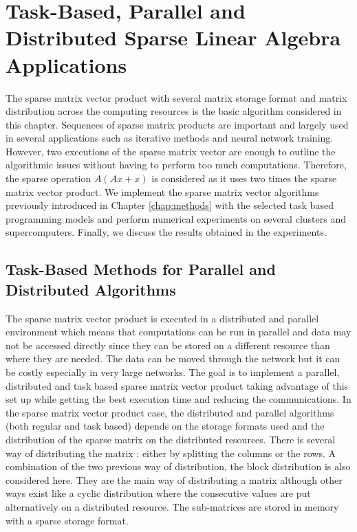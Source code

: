 %
\newcommand{\Array}{\KwSty{Array}}
\newcommand{\Integer}{\KwSty{Integer}}

\chapter{Task-Based, Parallel and Distributed Sparse Linear Algebra Applications \label{chap:exp_sparse}}
\graphicspath{{chapters/exp_sparse/}}

The sparse matrix vector product with several matrix storage format and matrix distribution across the computing resources is the basic algorithm considered in this chapter.
Sequences of sparse matrix products are important and largely used in several applications such as iterative methods and neural network training.
However, two executions of the sparse matrix vector are enough to outline the algorithmic issues without having to perform too much computations.
Therefore, the sparse operation $A(Ax+x)$ is considered as it uses two times the sparse matrix vector product.
We implement the sparse matrix vector algorithms previously introduced in Chapter \ref{chap:methods} with the selected task based programming models and perform numerical experiments on several clusters and supercomputers.
Finally, we discuss the results obtained in the experiments.


\section{Task-Based Methods for Parallel and Distributed Algorithms}
The sparse matrix vector product is executed in a distributed and parallel environment which means that computations can be run in parallel and data may not be accessed directly since they can be stored on a different resource than where they are needed.
The data can be moved through the network but it can be costly especially in very large networks.
The goal is to implement a parallel, distributed and task based sparse matrix vector product taking advantage of this set up while getting the best execution time and reducing the communications.
In the sparse matrix vector product case, the distributed and parallel algorithms (both regular and task based) depends on the storage formats used and the distribution of the sparse matrix on the distributed resources.
There is several way of distributing the matrix : either by splitting the columns or the rows.
A combination of the two previous way of distribution, the block distribution is also considered here.
They are the main way of distributing a matrix although other ways exist like a cyclic distribution where the consecutive values are put alternatively on a distributed resource.
The sub-matrices are stored in memory with a sparse storage format.


